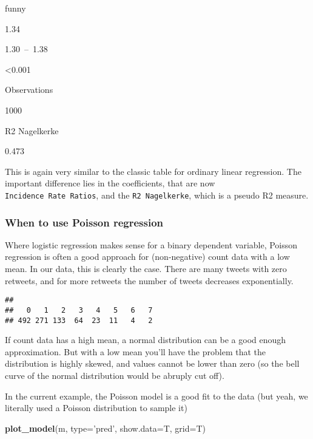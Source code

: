 \documentclass[
]{article}
\newenvironment{Shaded}{\begin{snugshade}}{\end{snugshade}}
\newcommand{\DataTypeTok}[1]{\textcolor[rgb]{0.13,0.29,0.53}{#1}}
\newcommand{\KeywordTok}[1]{\textcolor[rgb]{0.13,0.29,0.53}{\textbf{#1}}}
\newcommand{\NormalTok}[1]{#1}
\newcommand{\OperatorTok}[1]{\textcolor[rgb]{0.81,0.36,0.00}{\textbf{#1}}}
\newcommand{\StringTok}[1]{\textcolor[rgb]{0.31,0.60,0.02}{#1}}
\begin{document}
funny

1.34

1.30~--~1.38

\textless0.001

Observations

1000

R2 Nagelkerke

0.473

This is again very similar to the classic table for ordinary linear
regression. The important difference lies in the coefficients, that are
now \texttt{Incidence\ Rate\ Ratios}, and the \texttt{R2\ Nagelkerke},
which is a pseudo R2 measure.

\hypertarget{when-to-use-poisson-regression}{%
\subsubsection{When to use Poisson
regression}\label{when-to-use-poisson-regression}}

Where logistic regression makes sense for a binary dependent variable,
Poisson regression is often a good approach for (non-negative) count
data with a low mean. In our data, this is clearly the case. There are
many tweets with zero retweets, and for more retweets the number of
tweets decreases exponentially.

\begin{Shaded}
\end{Shaded}

\begin{verbatim}
## 
##   0   1   2   3   4   5   6   7 
## 492 271 133  64  23  11   4   2
\end{verbatim}

If count data has a high mean, a normal distribution can be a good
enough approximation. But with a low mean you'll have the problem that
the distribution is highly skewed, and values cannot be lower than zero
(so the bell curve of the normal distribution would be abruply cut off).

In the current example, the Poisson model is a good fit to the data (but
yeah, we literally used a Poisson distribution to sample it)

\begin{Shaded}
\begin{Highlighting}[]
\KeywordTok{plot_model}\NormalTok{(m, }\DataTypeTok{type=}\StringTok{'pred'}\NormalTok{, }\DataTypeTok{show.data=}\NormalTok{T, }\DataTypeTok{grid=}\NormalTok{T)}
\end{Highlighting}
\end{Shaded}
\end{document}
